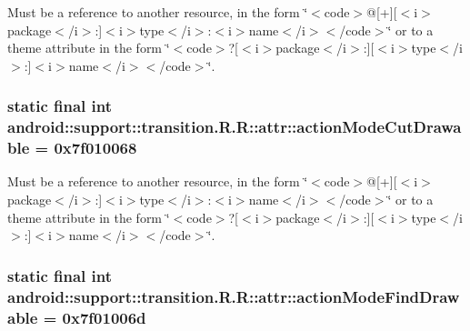 Must be a reference to another resource, in the form \char`\"{}$<$code$>$@\mbox{[}+\mbox{]}\mbox{[}$<$i$>$package$<$/i$>$:\mbox{]}$<$i$>$type$<$/i$>$:$<$i$>$name$<$/i$>$$<$/code$>$\char`\"{} or to a theme attribute in the form \char`\"{}$<$code$>$?\mbox{[}$<$i$>$package$<$/i$>$:\mbox{]}\mbox{[}$<$i$>$type$<$/i$>$:\mbox{]}$<$i$>$name$<$/i$>$$<$/code$>$\char`\"{}. \hypertarget{classandroid_1_1support_1_1transition_1_1_r_1_1attr_928b0310a36d49839b50d135836d18b9}{
\subsubsection[{actionModeCutDrawable}]{\setlength{\rightskip}{0pt plus 5cm}static final int android::support::transition.R.R::attr::actionModeCutDrawable = 0x7f010068}}
\label{classandroid_1_1support_1_1transition_1_1_r_1_1attr_928b0310a36d49839b50d135836d18b9}


Must be a reference to another resource, in the form \char`\"{}$<$code$>$@\mbox{[}+\mbox{]}\mbox{[}$<$i$>$package$<$/i$>$:\mbox{]}$<$i$>$type$<$/i$>$:$<$i$>$name$<$/i$>$$<$/code$>$\char`\"{} or to a theme attribute in the form \char`\"{}$<$code$>$?\mbox{[}$<$i$>$package$<$/i$>$:\mbox{]}\mbox{[}$<$i$>$type$<$/i$>$:\mbox{]}$<$i$>$name$<$/i$>$$<$/code$>$\char`\"{}. \hypertarget{classandroid_1_1support_1_1transition_1_1_r_1_1attr_c6349774411b667d9e02dc3928335f63}{
\subsubsection[{actionModeFindDrawable}]{\setlength{\rightskip}{0pt plus 5cm}static final int android::support::transition.R.R::attr::actionModeFindDrawable = 0x7f01006d}}
\label{classandroid_1_1support_1_1transition_1_1_r_1_1attr_c6349774411b667d9e02dc3928335f63}


